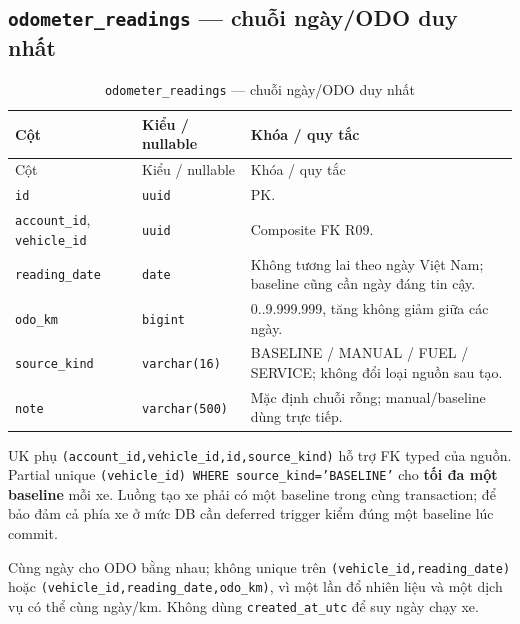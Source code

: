 \subsection{\texttt{odometer\_\allowbreak{}readings} — chuỗi ngày/ODO duy nhất}
\begin{smalltable}\begin{longtable}{L{3.0cm}L{3.2cm}L{8.2cm}}
\caption{\texttt{odometer\_\allowbreak{}readings} — chuỗi ngày/ODO duy nhất}\label{tab:dictionary-7}\\\toprule
Cột & Kiểu / nullable & Khóa / quy tắc\\\midrule\endfirsthead
\toprule Cột & Kiểu / nullable & Khóa / quy tắc\\\midrule\endhead
\texttt{id} & \texttt{uuid} & PK.\\
\texttt{account\_\allowbreak{}id}, \texttt{vehicle\_\allowbreak{}id} & \texttt{uuid} & Composite FK R09.\\
\texttt{reading\_\allowbreak{}date} & \texttt{date} & Không tương lai theo ngày Việt Nam; baseline cũng cần ngày đáng tin cậy.\\
\texttt{odo\_\allowbreak{}km} & \texttt{bigint} & 0..9.999.999, tăng không giảm giữa các ngày.\\
\texttt{source\_\allowbreak{}kind} & \texttt{varchar(16)} & BASELINE / MANUAL / FUEL / SERVICE; không đổi loại nguồn sau tạo.\\
\texttt{note} & \texttt{varchar(500)} & Mặc định chuỗi rỗng; manual/baseline dùng trực tiếp.\\
\bottomrule\end{longtable}\end{smalltable}
UK phụ \texttt{(account\_\allowbreak{}id,\allowbreak{}vehicle\_\allowbreak{}id,\allowbreak{}id,\allowbreak{}source\_\allowbreak{}kind)} hỗ trợ FK typed của nguồn. Partial unique \texttt{(vehicle\_\allowbreak{}id) WHERE source\_\allowbreak{}kind='BASELINE'} cho \textbf{tối đa một baseline} mỗi xe. Luồng tạo xe phải có một baseline trong cùng transaction; để bảo đảm cả phía xe ở mức DB cần deferred trigger kiểm đúng một baseline lúc commit.\par
Cùng ngày cho ODO bằng nhau; không unique trên \texttt{(vehicle\_\allowbreak{}id,\allowbreak{}reading\_\allowbreak{}date)} hoặc \texttt{(vehicle\_\allowbreak{}id,\allowbreak{}reading\_\allowbreak{}date,\allowbreak{}odo\_\allowbreak{}km)}, vì một lần đổ nhiên liệu và một dịch vụ có thể cùng ngày/km. Không dùng \texttt{created\_\allowbreak{}at\_\allowbreak{}utc} để suy ngày chạy xe.\par
